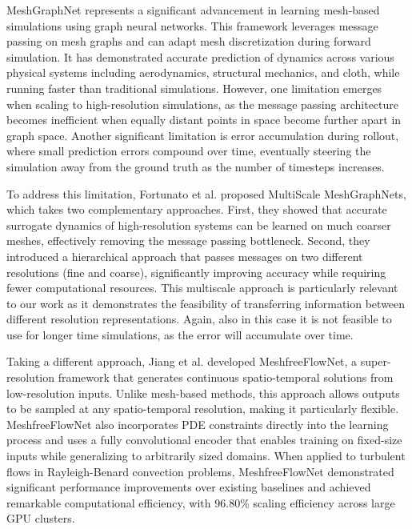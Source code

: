 MeshGraphNet \cite{pfaffLearningMeshBasedSimulation2021a} represents a significant advancement in learning mesh-based simulations using graph neural networks. This framework leverages message passing on mesh graphs and can adapt mesh discretization during forward simulation. It has demonstrated accurate prediction of dynamics across various physical systems including aerodynamics, structural mechanics, and cloth, while running  faster than traditional simulations. However, one limitation emerges when scaling to high-resolution simulations, as the message passing architecture becomes inefficient when equally distant points in space become further apart in graph space. Another significant limitation is error accumulation during rollout, where small prediction errors compound over time, eventually steering the simulation away from the ground truth as the number of timesteps increases.

To address this limitation, Fortunato et al. \cite{fortunatoMultiScaleMeshGraphNets2022} proposed MultiScale MeshGraphNets, which takes two complementary approaches. First, they showed that accurate surrogate dynamics of high-resolution systems can be learned on much coarser meshes, effectively removing the message passing bottleneck. Second, they introduced a hierarchical approach that passes messages on two different resolutions (fine and coarse), significantly improving accuracy while requiring fewer computational resources. This multiscale approach is particularly relevant to our work as it demonstrates the feasibility of transferring information between different resolution representations. Again, also in this case it is not feasible to use for longer time simulations, as the error will accumulate over time.

Taking a different approach, Jiang et al. \cite{jiangMeshfreeFlowNetPhysicsConstrainedDeep2020} developed MeshfreeFlowNet, a super-resolution framework that generates continuous spatio-temporal solutions from low-resolution inputs. Unlike mesh-based methods, this approach allows outputs to be sampled at any spatio-temporal resolution, making it particularly flexible. MeshfreeFlowNet also incorporates PDE constraints directly into the learning process and uses a fully convolutional encoder that enables training on fixed-size inputs while generalizing to arbitrarily sized domains. When applied to turbulent flows in Rayleigh-Benard convection problems, MeshfreeFlowNet demonstrated significant performance improvements over existing baselines and achieved remarkable computational efficiency, with 96.80\% scaling efficiency across large GPU clusters.

